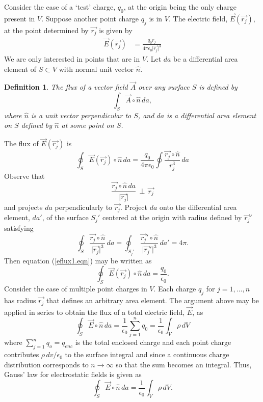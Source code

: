 \documentclass[12pt]{article}
\newtheorem{definition}{Definition}[section]
\theoremstyle{definition}
\numberwithin{equation}{section}
\begin{document}
Consider the case of a `test' charge, $q_0$, at the origin being the only charge present in $V$. Suppose another point charge $q_j$ is in $V$. The electric field, $\vec{E}(\vec{r_j})$, at the point determined by $\vec{r_j}$ is given by
\begin{align}
\vec{E}(\vec{r_j})&=\frac{q_0 r_j}{4\pi\epsilon_0\vert\vec{r_j}\vert^3}
\label{efield3.eqn}
\end{align}
We are only interested in points that are in $V$. Let $da$ be a differential area element of $S\subset V$ with normal unit vector $\hat{n}$.
\begin{definition}
The flux of a vector field $\vec{A}$ over any surface $S$ is defined by $$\int_{S}\vec{A}\circ\hat{n}\,da,$$ where $\hat{n}$ is a unit vector perpendicular to $S$, and $da$ is a differential area element on $S$ defined by $\hat{n}$ at some point on $S$. 
\end{definition}
The flux of $\vec{E}(\vec{r_j})$ is 
\begin{equation}
\oint_{S}\vec{E}(\vec{r_j})\circ\hat{n}\,da=\frac{q_0}{4\pi\epsilon_0}\oint\frac{\vec{r_j}\circ\hat{n}}{r_j^3}\,da
\label{eflux1.eqn}
\end{equation}
Observe that
$$\frac{\vec{r_j}\circ\hat{n}\,da}{\vert\vec{r_j}\vert}\,\perp\,\vec{r_j}$$ and projects $da$ perpendicularly to $\vec{r_j}$. Project $da$ onto the differential area element, $da'$, of the surface $S_j '$ centered at the origin with radius defined by $\vec{r_j}'$ satisfying
$$\oint_S\frac{\vec{r_j}\circ\hat{n}}{\vert\vec{r_j}\vert^3}\,da=\oint_{S_j '}\frac{\vec{r_j}'\circ\hat{n}}{\vert\vec{r_j}'\vert^3}\,da'=4\pi.$$
Then equation (\ref{eflux1.eqn}) may be written as
$$\oint_{S}\vec{E}(\vec{r_j})\circ\hat{n}\,da=\frac{q_0}{\epsilon_0}.$$
Consider the case of multiple point charges in $V$. Each charge $q_j$ for $j=1,...,n$ has radius $\vec{r_j}$ that defines an arbitrary area element. The argument above may be applied in series to obtain the flux of a total electric field, $\vec{E}$, as
$$\oint_S\vec{E}\circ\hat{n}\,da=\frac{1}{\epsilon_0}\sum_{j=1}^n q_0=\frac{1}{\epsilon_0}\int_V\rho\,dV$$
where $\sum_{j=1}^n q_o=q_{enc}$ is the total enclosed charge and each point charge contributes $\rho\,dv\slash\epsilon_0$ to the surface integral and since a continuous charge distribution corresponds to $n\rightarrow\infty$ so that the sum becomes an integral. Thus, Gauss' law for electrostatic fields is given as
\begin{equation}
\oint_S\vec{E}\circ\hat{n}\,da=\frac{1}{\epsilon_0}\int_V\rho\,dV.
\label{gaussint.eqn}
\end{equation}
\end{document}
